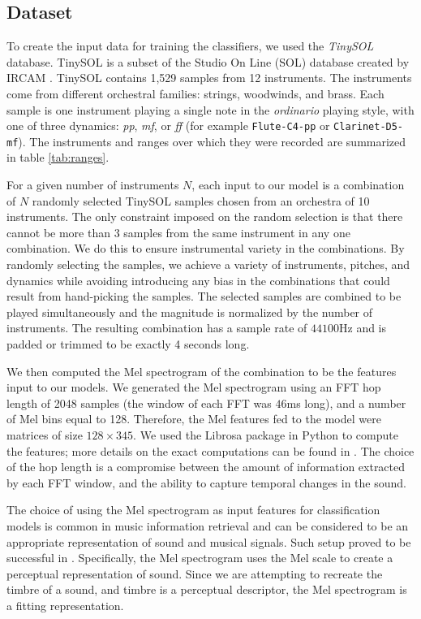 \documentclass[runningheads,a4paper]{llncs}
\begin{document}
\subsection{Dataset}
\label{sec:dataset}

To create the input data for training the classifiers, we used the \emph{TinySOL} database. TinySOL is a subset of the Studio On Line (SOL) database created by IRCAM \cite{Cella2020b}. TinySOL contains 1,529 samples from 12 instruments. The instruments come from different orchestral families: strings, woodwinds, and brass. Each sample is one instrument playing a single note in the \emph{ordinario} playing style, with one of three dynamics: \textit{pp}, \textit{mf}, or \textit{ff} (for example \texttt{Flute-C4-pp} or \texttt{Clarinet-D5-mf}). The instruments and ranges over which they were recorded are summarized in table \ref{tab:ranges}.

For a given number of instruments $N$, each input to our model is a combination of $N$ randomly selected TinySOL samples chosen from an orchestra of 10 instruments. The only constraint imposed on the random selection is that there cannot be more than 3 samples from the same instrument in any one combination. We do this to ensure instrumental variety in the combinations. By randomly selecting the samples, we achieve a variety of instruments, pitches, and dynamics while avoiding introducing any bias in the combinations that could result from hand-picking the samples. The selected samples are combined to be played simultaneously and the magnitude is normalized by the number of instruments. The resulting combination has a sample rate of $44100$Hz and is padded or trimmed to be exactly 4 seconds long.

We then computed the Mel spectrogram of the combination to be the features input to our models. We generated the Mel spectrogram using an FFT hop length of 2048 samples (the window of each FFT was $46$ms long), and a number of Mel bins equal to 128. Therefore, the Mel features fed to the model were matrices of size $128\times 345$. We used the Librosa package in Python to compute the features; more details on the exact computations can be found in \cite{mcfee15}. The choice of the hop length is a compromise between the amount of information extracted by each FFT window, and the ability to capture temporal changes in the sound.

The choice of using the Mel spectrogram as input features for classification models is common in music information retrieval \cite{McKinney2003} and can be considered to be an appropriate representation of sound and musical signals. Such setup proved to be successful in \cite{Salamon17}. Specifically, the Mel spectrogram uses the Mel scale to create a perceptual representation of sound. Since we are attempting to recreate the timbre of a sound, and timbre is a perceptual descriptor, the Mel spectrogram is a fitting representation.
 
\end{document}
